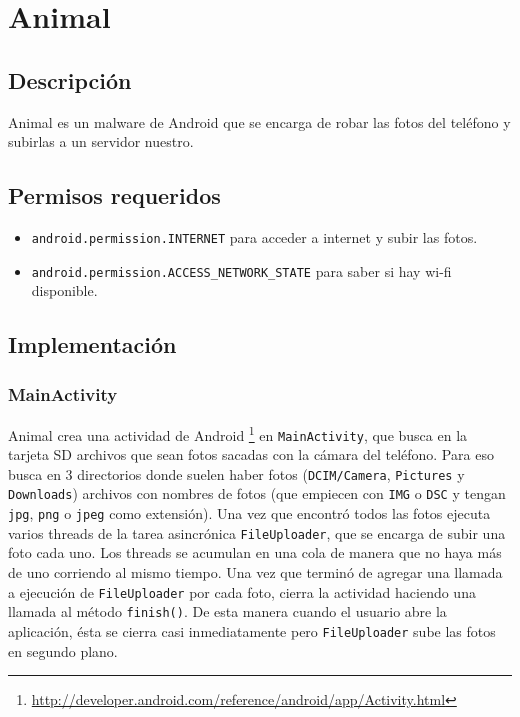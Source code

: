 \section{Animal}

	\subsection{Descripción}

	Animal es un malware de Android que se encarga de robar las fotos del teléfono y subirlas a un servidor nuestro. 

	\subsection{Permisos requeridos}
		\begin{itemize}
			\item \texttt{android.permission.INTERNET} para acceder a internet y subir las fotos.
			\item \texttt{android.permission.ACCESS\_NETWORK\_STATE} para saber si hay wi-fi disponible.
		\end{itemize}

	\subsection{Implementación}

		\subsubsection{MainActivity}
			Animal crea una actividad de Android \footnote{ \url{http://developer.android.com/reference/android/app/Activity.html} } en \texttt{MainActivity}, que busca en la tarjeta SD archivos que sean fotos sacadas con la cámara del teléfono. Para eso busca en 3 directorios donde suelen haber fotos (\texttt{DCIM/Camera}, \texttt{Pictures} y \texttt{Downloads}) archivos con nombres de fotos (que empiecen con \texttt{IMG} o \texttt{DSC} y tengan \texttt{jpg}, \texttt{png} o \texttt{jpeg} como extensión). Una vez que encontró todos las fotos ejecuta varios threads de la tarea asincrónica \texttt{FileUploader}, que se encarga de subir una foto cada uno. Los threads se acumulan en una cola de manera que no haya más de uno corriendo al mismo tiempo. Una vez que terminó de agregar una llamada a ejecución de \texttt{FileUploader} por cada foto, cierra la actividad haciendo una llamada al método \texttt{finish()}. De esta manera cuando el usuario abre la aplicación, ésta se cierra casi inmediatamente pero \texttt{FileUploader} sube las fotos en segundo plano. 

